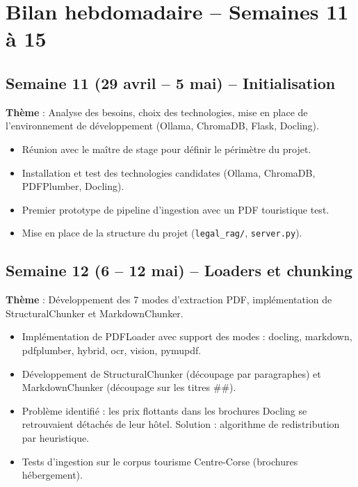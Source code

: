 \documentclass[12pt,a4paper]{report}
\begin{document}
\chapter{Bilan hebdomadaire -- Semaines 11 \`{a} 15}

\section{Semaine 11 (29 avril -- 5 mai) -- Initialisation}
\begin{infobox}
\textbf{Th\`{e}me} : Analyse des besoins, choix des technologies, mise en place de l'environnement
de d\'{e}veloppement (Ollama, ChromaDB, Flask, Docling).
\end{infobox}
\begin{itemize}[leftmargin=*]
  \item R\'{e}union avec le ma\^{i}tre de stage pour d\'{e}finir le p\'{e}rim\`{e}tre du projet.
  \item Installation et test des technologies candidates (Ollama, ChromaDB, PDFPlumber, Docling).
  \item Premier prototype de pipeline d'ingestion avec un PDF touristique test.
  \item Mise en place de la structure du projet (\texttt{legal\_rag/}, \texttt{server.py}).
\end{itemize}

\section{Semaine 12 (6 -- 12 mai) -- Loaders et chunking}
\begin{infobox}
\textbf{Th\`{e}me} : D\'{e}veloppement des 7 modes d'extraction PDF, impl\'{e}mentation de
StructuralChunker et MarkdownChunker.
\end{infobox}
\begin{itemize}[leftmargin=*]
  \item Impl\'{e}mentation de PDFLoader avec support des modes : docling, markdown, pdfplumber,
        hybrid, ocr, vision, pymupdf.
  \item D\'{e}veloppement de StructuralChunker (d\'{e}coupage par paragraphes) et MarkdownChunker
        (d\'{e}coupage sur les titres \#\#).
  \item Probl\`{e}me identifi\'{e} : les prix flottants dans les brochures Docling se retrouvaient
        d\'{e}tach\'{e}s de leur h\^{o}tel. Solution : algorithme de redistribution par heuristique.
  \item Tests d'ingestion sur le corpus tourisme Centre-Corse (brochures h\'{e}bergement).
\end{itemize}
\end{document}
